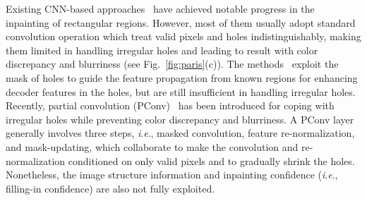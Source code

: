 \documentclass[10pt,journal,compsoc]{IEEEtran}
\newcommand{\ie}{\textit{i}.\textit{e}.}
\begin{document}


Existing CNN-based approaches~\cite{pathakCVPR16context,IizukaGL,Yang_2017_CVPR, song_contextual_2018,Yan_2018_Shift,yu2018generative} have achieved notable progress in the inpainting of rectangular regions.
%
However, most of them usually adopt standard convolution operation which treat valid pixels and holes indistinguishably, making them limited in handling irregular holes and leading to result with color discrepancy and blurriness (see Fig.~\ref{fig:paris}(c)).
%
The methods~\cite{song_contextual_2018,Yan_2018_Shift,yu2018generative} exploit the mask of holes to guide the feature propagation from known regions for enhancing decoder features in the holes, but are still insufficient in handling irregular holes.
%
Recently, partial convolution (PConv)~\cite{partialconv2017} has been introduced for coping with irregular holes while preventing color discrepancy and blurriness.
%
A PConv layer generally involves three steps, \ie, masked convolution, feature re-normalization, and mask-updating, which collaborate to make the convolution and re-normalization conditioned on only valid pixels and to gradually shrink the holes.
%
Nonetheless, the image structure information and inpainting confidence (\ie, filling-in confidence) are also not fully exploited.
%



\end{document}
